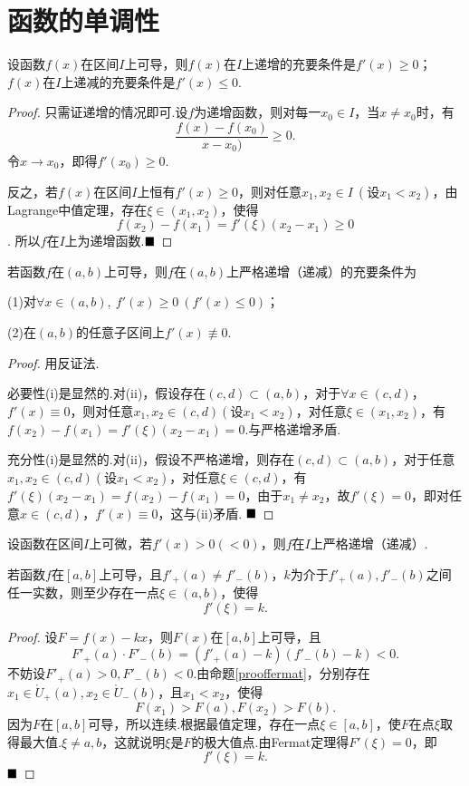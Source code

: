 \section{函数的单调性}
\begin{theorem}
	设函数$f(x)$在区间$I$上可导，则$f(x)$在$I$上递增的充要条件是$f'(x)\geqslant 0$；$f(x)$在$I$上递减的充要条件是$f'(x)\leqslant 0$.
\end{theorem}
\begin{proof}
	只需证递增的情况即可.设$f$为递增函数，则对每一$x_0\in I$，当$x\neq x_0$时，有
	$$\frac{f(x)-f(x_0)}{x-x_0)}\geqslant 0.$$
	令$x\to x_0$，即得$f'(x_0)\geqslant 0$.
	
	反之，若$f(x)$在区间$I$上恒有$f'(x)\geqslant 0$，则对任意$x_1,x_2\in I\ (\text{设}x_1<x_2)$，由Lagrange中值定理，存在$\xi\in(x_1,x_2)$，使得
	$$f(x_2)-f(x_1)=f'(\xi)(x_2-x_1)\geqslant 0$$.
	所以$f$在$I$上为递增函数.$\hfill\blacksquare$
\end{proof}
\begin{theorem}
	若函数$f$在$(a,b)$上可导，则$f$在$(a,b)$上严格递增（递减）的充要条件为
	
	(1)对$\forall x\in(a,b),\ f'(x)\geqslant 0\ (f'(x)\leqslant 0)$；
	
	(2)在$(a,b)$的任意子区间上$f'(x)\not\equiv 0$.
\end{theorem}
\begin{proof}
	用反证法.
	
	必要性\qquad (i)是显然的.对(ii)，假设存在$(c,d)\subset(a,b)$，对于$\forall x\in(c,d)$，$f'(x)\equiv 0$，则对任意$x_1,x_2\in (c,d)(\text{设}x_1<x_2)$，对任意$\xi\in(x_1,x_2)$，有$f(x_2)-f(x_1)=f'(\xi)(x_2-x_1)=0$.与严格递增矛盾.
	
	充分性\qquad (i)是显然的.对(ii)，假设不严格递增，则存在$(c,d)\subset(a,b)$，对于任意$x_1,x_2\in (c,d)(\text{设}x_1<x_2)$，对任意$\xi\in(c,d)$，有$f'(\xi)(x_2-x_1)=f(x_2)-f(x_1)=0$，由于$x_1\neq x_2$，故$f'(\xi)=0$，即对任意$x\in(c,d)$，$f'(x)\equiv 0$，这与(ii)矛盾.
	$\hfill\blacksquare$
\end{proof}
\begin{corollary}
	设函数在区间$I$上可微，若$f'(x)>0(<0)$，则$f$在$I$上严格递增（递减）.
\end{corollary}
\begin{theorem}[Darboux定理]
	若函数$f$在$\left[a,b\right]$上可导，且$f'_+(a)\neq f'_-(b)$，$k$为介于$f'_+(a),f'_-(b)$之间任一实数，则至少存在一点$\xi\in(a,b)$，使得
	$$f'(\xi)=k.$$
\end{theorem}
\begin{proof}
	设$F=f(x)-kx$，则$F(x)$在$\left[a,b\right]$上可导，且
	$$F'_+(a)\cdot F'_-(b)=(f'_+(a)-k)(f'_-(b)-k)<0.$$
	不妨设$F'_+(a)>0,F'_-(b)<0$.由命题\ref{prooffermat}，分别存在$x_1\in\mathring{U}_+(a),x_2\in\mathring{U}_-(b)$，且$x_1<x_2$，使得
	$$F(x_1)>F(a),F(x_2)>F(b).$$
	因为$F$在$\left[a,b\right]$可导，所以连续.根据最值定理，存在一点$\xi\in\left[a,b\right]$，使$F$在点$\xi$取得最大值.$\xi\neq a,b$，这就说明$\xi$是$F$的极大值点.由Fermat定理得$F'(\xi)=0$，即
	$$f'(\xi)=k.$$ $\hfill\blacksquare$
\end{proof}
